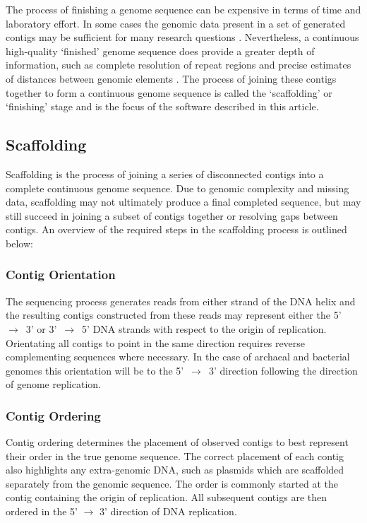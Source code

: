 \documentclass[10pt]{bmc_article}
\newenvironment{bmcformat}{\begin{raggedright}\baselineskip20pt\sloppy\setboolean{publ}{false}}{\end{raggedright}\baselineskip20pt\sloppy}
\begin{document}
\begin{bmcformat}
The process of finishing a genome sequence can be expensive in terms of time
and laboratory effort. In some cases the genomic data present in a set of
generated contigs may be sufficient for many research questions
\cite{branscomb2002}. Nevertheless, a continuous high-quality `finished'
genome sequence does provide a greater depth of information, such as complete
resolution of repeat regions and precise estimates of distances between
genomic elements \cite{parkhill2002,fraser2002}. The process of joining these
contigs together to form a continuous genome sequence is called the
`scaffolding' or `finishing' stage and is the focus of the software described
in this article. \pb

\subsection*{Scaffolding} %

Scaffolding is the process of joining a series of disconnected contigs into a
complete continuous genome sequence. Due to genomic complexity and missing
data, scaffolding may not ultimately produce a final completed sequence, but
may still succeed in joining a subset of contigs together or resolving gaps
between contigs. An overview of the required steps in the scaffolding process
is outlined below:

\subsubsection*{Contig Orientation} %

The sequencing process generates reads from either strand of the DNA helix and
the resulting contigs constructed from these reads may represent either the
5'~$\rightarrow$~3' or 3'~$\rightarrow$~5' DNA strands with respect to the
origin of replication. Orientating all contigs to point in the same direction
requires reverse complementing sequences where necessary. In the case of
archaeal and bacterial genomes this orientation will be to the
5'~$\rightarrow$~3' direction following the direction of genome replication.

\subsubsection*{Contig Ordering} %

Contig ordering determines the placement of observed contigs to best represent
their order in the true genome sequence. The correct placement of each contig
also highlights any extra-genomic DNA, such as plasmids which are scaffolded
separately from the genomic sequence. The order is commonly started at the
contig containing the origin of replication. All subsequent contigs are then
ordered in the 5' $\rightarrow$ 3' direction of DNA replication.


\end{bmcformat}
\end{document}

